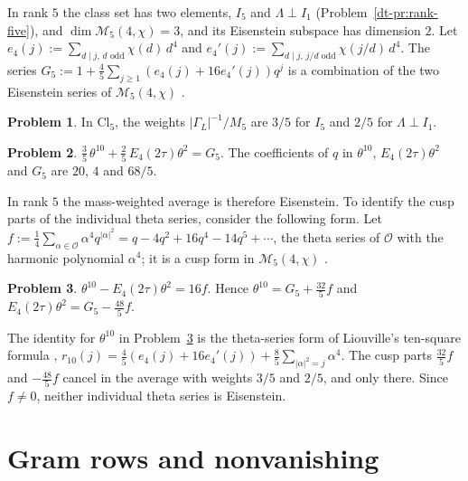 \documentclass[reqno]{amsart}
\theoremstyle{definition}
\newtheorem{problem}{Problem}[section]
\theoremstyle{plain}
\newcommand{\Oc}{\mathcal{O}}
\newcommand{\Mf}{\mathcal{M}}
\newcommand{\Cl}{\mathrm{Cl}}
\begin{document}
In rank \(5\) the class set has two elements, \(I_5\) and \(\Lambda \perp I_1\) (Problem~\ref{dt-pr:rank-five}), and \(\dim \Mf_5(4,\chi) = 3\), and its Eisenstein subspace has dimension \(2\).  Let \(e_4(j) := \sum_{d \mid j,\, d \text{ odd}} \chi(d)\, d^4\) and \(e_4'(j) := \sum_{d \mid j,\, j/d \text{ odd}} \chi(j/d)\, d^4\).  The series \(G_5 := 1 + \frac45\sum_{j \ge 1}(e_4(j) + 16e_4'(j))q^j\) is a combination of the two Eisenstein series of \(\Mf_5(4,\chi)\) \cite[\S4.5]{DS}.

\begin{problem}\label{pr:weights5}
In \(\Cl_5\), the weights \(\lvert\Gamma_L\rvert^{-1}/M_5\) are \(3/5\) for \(I_5\) and \(2/5\) for \(\Lambda \perp I_1\).
\end{problem}

\begin{problem}\label{pr:SW5}
\(\frac35\,\theta^{10} + \frac25\,E_4(2\tau)\theta^2 = G_5\).  The coefficients of \(q\) in \(\theta^{10}\), \(E_4(2\tau)\theta^2\) and \(G_5\) are \(20\), \(4\) and \(68/5\).
\end{problem}

In rank \(5\) the mass-weighted average is therefore Eisenstein.  To identify the cusp parts of the individual theta series, consider the following form.  Let \(f := \frac14\sum_{\alpha \in \Oc}\alpha^4 q^{\lvert\alpha\rvert^2} = q - 4q^2 + 16q^4 - 14q^5 + \cdots\), the theta series of \(\Oc\) with the harmonic polynomial \(\alpha^4\); it is a cusp form in \(\Mf_5(4,\chi)\) \cite[Ch.~10]{Iw}.

\begin{problem}\label{pr:cusp5}
\(\theta^{10} - E_4(2\tau)\theta^2 = 16f\).  Hence \(\theta^{10} = G_5 + \frac{32}{5}f\) and \(E_4(2\tau)\theta^2 = G_5 - \frac{48}{5}f\).
\end{problem}

The identity for \(\theta^{10}\) in Problem~\ref{pr:cusp5} is the theta-series form of Liouville's ten-square formula \cite{Liouville}, \(r_{10}(j) = \frac45(e_4(j) + 16e_4'(j)) + \frac85\sum_{\lvert\alpha\rvert^2 = j}\alpha^4\).  The cusp parts \(\frac{32}{5}f\) and \(-\frac{48}{5}f\) cancel in the average with weights \(3/5\) and \(2/5\), and only there.  Since \(f\ne0\), neither individual theta series is Eisenstein.


\section{Gram rows and nonvanishing}\label{sec:gram}
\end{document}
